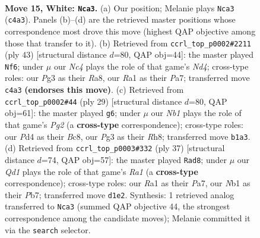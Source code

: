 \documentclass[11pt]{article}
\begin{document}
\begin{figure}[p]
\label{fig:thought-m26}
\end{figure}

\clearpage

\begin{figure}[p]\centering
\begin{subfigure}{0.46\textwidth}\centering
\resizebox{\linewidth}{!}{%
\newchessgame
\chessboard[
  setfen={r1bqr1k1/1pp2p1p/2n5/p2p2b1/2NP4/4P1P1/PP3P2/RNBQR1K1 w - - 0 15},
  showmover=false,
  pgfstyle=straightmove, color=movearrow, markmove={c4-a3}
]}
\caption{}
\end{subfigure}\hfill
\begin{subfigure}{0.46\textwidth}\centering
\resizebox{\linewidth}{!}{%
\newchessgame
\chessboard[
  setfen={r6k/pp4pp/2n1b2q/3npr2/4Np2/2P2B2/PP3PPP/R1BQR1K1 b - - 9 22},
  showmover=false,
  pgfstyle=straightmove, color=movearrow, markmove={d5-f6}
]}
\caption{}
\end{subfigure}
\\[4pt]
\begin{subfigure}{0.46\textwidth}\centering
\resizebox{\linewidth}{!}{%
\newchessgame
\chessboard[
  setfen={r1bqk2r/1p3pp1/p3p2p/3pPn2/1Pn2N2/3B4/2P2PPP/R1BQR1K1 b kq - 1 15},
  showmover=false,
  pgfstyle=straightmove, color=movearrow, markmove={g7-g6}
]}
\caption{}
\end{subfigure}\hfill
\begin{subfigure}{0.46\textwidth}\centering
\resizebox{\linewidth}{!}{%
\newchessgame
\chessboard[
  setfen={r3r1k1/ppqn1pp1/2p4p/3npP2/2N3P1/6QP/PPP2PB1/2R1R1K1 b - - 0 19},
  showmover=false,
  pgfstyle=straightmove, color=movearrow, markmove={a8-d8}
]}
\caption{}
\end{subfigure}
\caption{\textbf{Move 15, White: \texttt{Nca3}.} (a) Our position; Melanie plays \texttt{Nca3} (\texttt{c4a3}). Panels (b)--(d) are the retrieved master positions whose correspondence most drove this move (highest QAP objective among those that transfer to it). (b) Retrieved from \texttt{ccrl\_top\_p0002\#2211} (ply 43) [structural distance $d$=80, QAP obj=44]: the master played \texttt{Nf6}; under $\mu$ our \emph{Nc4} plays the role of that game's \emph{Nd4}; cross-type roles: our \emph{P}g3 as their \emph{R}a8, our \emph{R}a1 as their \emph{P}a7; transferred move \texttt{c4a3} \textbf{(endorses this move)}. (c) Retrieved from \texttt{ccrl\_top\_p0002\#44} (ply 29) [structural distance $d$=80, QAP obj=61]: the master played \texttt{g6}; under $\mu$ our \emph{Nb1} plays the role of that game's \emph{Pg2} (a \textbf{cross-type} correspondence); cross-type roles: our \emph{P}d4 as their \emph{B}c8, our \emph{P}g3 as their \emph{R}h8; transferred move \texttt{b1a3}. (d) Retrieved from \texttt{ccrl\_top\_p0003\#332} (ply 37) [structural distance $d$=74, QAP obj=57]: the master played \texttt{Rad8}; under $\mu$ our \emph{Qd1} plays the role of that game's \emph{Ra1} (a \textbf{cross-type} correspondence); cross-type roles: our \emph{R}a1 as their \emph{P}a7, our \emph{N}b1 as their \emph{P}b7; transferred move \texttt{d1e2}. Synthesis: 1 retrieved analog transferred to \texttt{Nca3} (summed QAP objective 44, the strongest correspondence among the candidate moves); Melanie committed it via the \texttt{search} selector.}

\end{figure}
\end{document}

